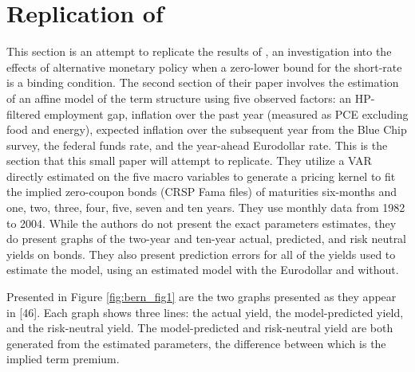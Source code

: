 \documentclass{article}
\numberwithin{equation}{section}
\begin{document}
\section{Replication of \citet{sack2005monetary}}\label{sec:repl}

This section is an attempt to replicate the results of
\citet{sack2005monetary}, an investigation into the effects of alternative
monetary policy when a zero-lower bound for the short-rate is a binding
condition. The second section of their paper involves the estimation of an
affine model of the term structure using five observed factors: an HP-filtered
employment gap, inflation over the past year (measured as PCE excluding food
and energy), expected inflation over the subsequent year from the Blue Chip
survey, the federal funds rate, and the year-ahead Eurodollar rate. This is the
section that this small paper will attempt to replicate. They utilize a VAR
directly estimated on the five macro variables to generate a pricing kernel to
fit the implied zero-coupon bonds (CRSP Fama files) of maturities six-months
and one, two, three, four, five, seven and ten years. They use monthly data
from 1982 to 2004. While the authors do not present the exact parameters
estimates, they do present graphs of the two-year and ten-year actual,
predicted, and risk neutral yields on bonds. They also present prediction
errors for all of the yields used to estimate the model, using an estimated
model with the Eurodollar and without.

Presented in Figure \ref{fig:bern_fig1} are the two graphs presented as they
appear in \citet{sack2005monetary}[46]. Each graph shows three lines: the
actual yield, the model-predicted yield, and the risk-neutral yield. The
model-predicted and risk-neutral yield are both generated from the estimated
parameters, the difference between which is the implied term premium. 
\end{document}
